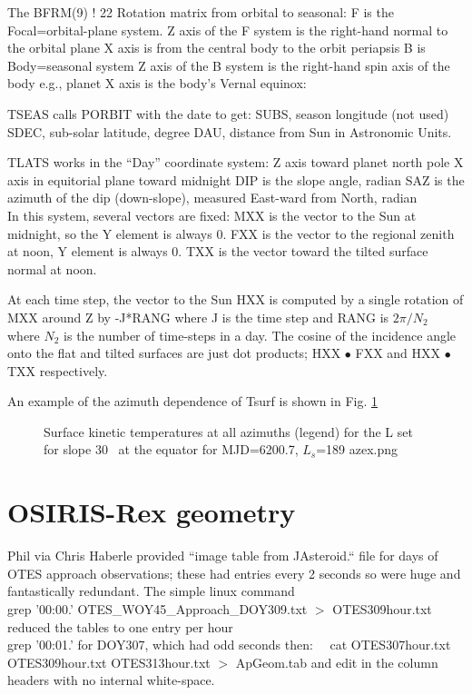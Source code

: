 \documentclass{article}
\begin{document}
The BFRM(9) ! 22 Rotation matrix from orbital to seasonal:
\qi F is the Focal=orbital-plane system.
\qii Z axis of the F system is the right-hand normal to the orbital plane
\qii X axis is from the central body to the orbit periapsis
\qi B is Body=seasonal system
\qii Z axis of the B system is the right-hand spin axis of the body e.g., planet
\qii X axis is the body’s Vernal equinox: 

TSEAS calls PORBIT with the date to get:
\qi SUBS, season longitude (not used)
\qi SDEC, sub-solar latitude, degree
\qi DAU, distance from Sun in Astronomic Units. 

TLATS works in the ``Day'' coordinate system: 
\qii Z axis toward planet north pole
\qii  X axis in equitorial plane toward midnight 
\qi DIP is the slope angle, radian
\qi SAZ is the azimuth of the dip (down-slope), measured East-ward from North, radian
\\ In this system, several vectors are fixed:
\qi MXX is the vector to the Sun at midnight, so the Y element is always 0.
\qi FXX is the vector to the regional zenith at noon,  Y element is always 0.
\qi TXX is the vector toward the tilted surface normal at noon.

At each time step, the vector to the Sun HXX is computed by a single rotation of
MXX around Z by -J*RANG where J is the time step and RANG is $2 \pi / N_2$ where
$N_2$ is the number of time-steps in a day. The cosine of the incidence angle
onto the flat and tilted surfaces are just dot products; HXX $\bullet$ FXX and 
 HXX $\bullet$ TXX respectively. 

An example of the azimuth dependence of Tsurf is shown in Fig. 
\ref{azex}
\begin{figure}[!ht] 
\caption[Example of azimuth set]{Surface kinetic temperatures at all azimuths (legend) for the L set for slope 30\qd~ at the equator for MJD=6200.7, $L_s$=189 
\label{azex}  azex.png  }
\end{figure} 


\section{OSIRIS-Rex geometry}
Phil via Chris Haberle provided  ``image table from JAsteroid.`` file for 
 days of OTES approach observations; these had entries every 2 seconds so were huge and fantastically redundant. The simple linux command  
\\  grep '00:00.' OTES_WOY45_Approach_DOY309.txt $>$ OTES309hour.txt reduced the tables to one entry per hour
\\  grep '00:01.' for DOY307, which had odd seconds
\qi then: \ \  cat OTES307hour.txt  OTES309hour.txt OTES313hour.txt $>$ ApGeom.tab
\qii and edit in the column headers with no internal white-space.
\end{document}
